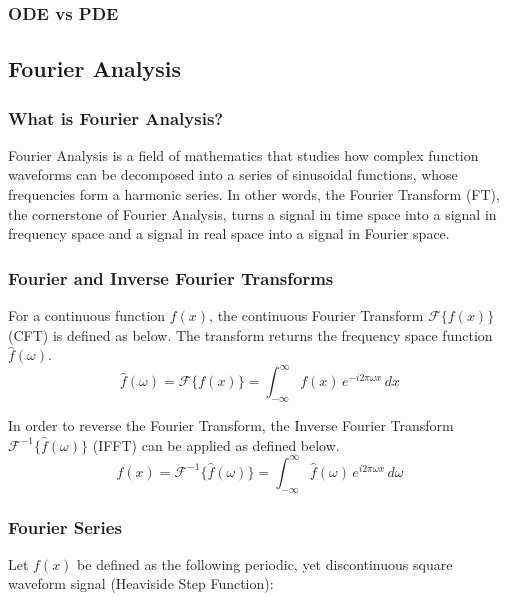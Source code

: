 \subsubsection{ODE vs PDE}

\subsection{Fourier Analysis}
\subsubsection{What is Fourier Analysis?}
Fourier Analysis is a field of mathematics that studies how complex function waveforms can be decomposed into a series of sinusoidal functions, whose frequencies form a harmonic series. In other words, the Fourier Transform (FT), the cornerstone of Fourier Analysis, turns a signal in time space into a signal in frequency space and a signal in real space into a signal in Fourier space.

\subsubsection{Fourier and Inverse Fourier Transforms}
\begin{definition}
    For a continuous function $f(x)$, the continuous Fourier Transform $\mathcal{F}\{ f(x) \}$ (CFT) is defined as below. The transform returns the frequency space function $\hat{f}(\omega)$.
    \[ \hat{f}(\omega) = \mathcal{F}\{ f(x) \} = \int_{-\infty}^{\infty} f(x)  \, e^{-i 2\pi \omega x} \,dx \]
\end{definition}


\begin{definition}
    In order to reverse the Fourier Transform, the Inverse Fourier Transform $\mathcal{F}^{-1}\{ \hat{f}(\omega) \}$ (IFFT) can be applied as defined below.
    \[ f(x) = \mathcal{F}^{-1}\{ \hat{f}(\omega) \} = \int_{-\infty}^{\infty} \hat{f}(\omega) \, e^{i 2\pi \omega x} \,d \omega \]
\end{definition}

\subsubsection{Fourier Series}
Let \(f(x)\) be defined as the following periodic, yet discontinuous square waveform signal (Heaviside Step Function):

